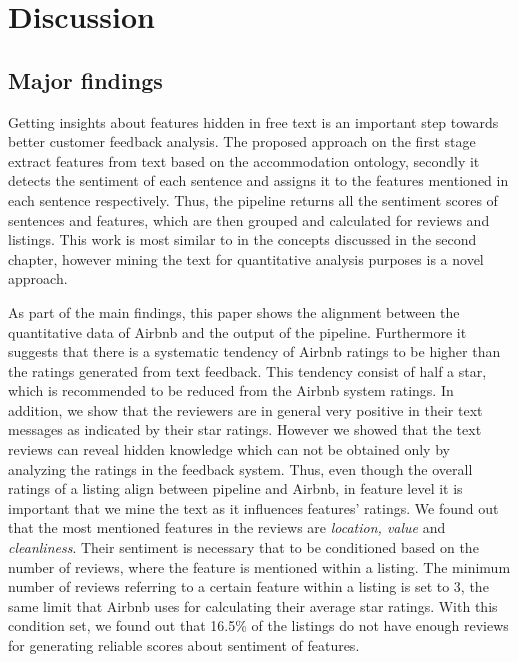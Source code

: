 %
%
\let\textcircled=\pgftextcircled
\chapter{Discussion}
\label{chap:dis}
\section{Major findings}
Getting insights about features hidden in free text is an important step towards better customer feedback analysis. The proposed approach on the first stage extract features from text based on the accommodation ontology, secondly it detects the sentiment of each sentence and assigns it to the features mentioned in each sentence respectively. Thus, the pipeline returns all the sentiment scores of sentences and features, which are then grouped and calculated for reviews and listings. This work is most similar to \cite{eirinaki2012feature,ali2015type,penalver2014feature} in the concepts discussed in the second chapter, however mining the text for quantitative analysis purposes is a novel approach. 

As part of the main findings, this paper shows the alignment between the quantitative data of Airbnb and the output of the pipeline. Furthermore it suggests that there is a systematic tendency of Airbnb ratings to be higher than the ratings generated from text feedback. This tendency consist of half a star, which is recommended to be reduced from the Airbnb system ratings. In addition, we show that the reviewers are in general very positive in their text messages as indicated by their star ratings. However we showed that the text reviews can reveal hidden knowledge which can not be obtained only by analyzing the ratings in the feedback system. Thus, even though the overall ratings of a listing align between pipeline and Airbnb, in feature level it is important that we mine the text as it influences features' ratings. We found out that the most mentioned features in the reviews are \textit{location, value} and \textit{cleanliness}. Their sentiment is necessary that to be conditioned based on the number of reviews, where the feature is mentioned within a listing. The minimum number of reviews referring to a certain feature within a listing is set to 3, the same limit that Airbnb uses for calculating their average star ratings. With this condition set, we found out that 16.5\% of the listings do not have enough reviews for generating reliable scores about sentiment of features.

